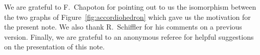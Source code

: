 \documentclass{amsart}
\theoremstyle{definition}
\newcommand{\fref}[1]{Figure~\ref{#1}} %
\begin{document}
We are grateful to F.~Chapoton for pointing out to us the isomorphism between the two graphs of \fref{fig:accordiohedron} which gave us the motivation for the present note.
We also thank R.~Schiffler for his comments on a previous version.
Finally, we are grateful to an anonymous referee for helpful suggestions on the presentation of this note.




\label{sec:biblio}

\end{document}
